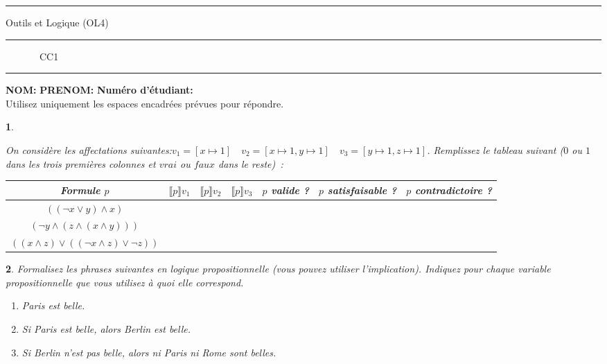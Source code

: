 \documentclass[a4paper,10pt,french]{article}
\newtheorem{exi}{}
\newenvironment{exo}{\begin{exi}\em}{\end{exi}}
\newcommand{\rsem}{\rrbracket}
\newcommand{\inte}[2]{\llbracket #1 \rsem {#2}}
\begin{document}
\vspace*{-1cm}
\hrule
\medbreak
\centerline{\textsf{O{\small utils} et L{\small ogique} (OL4)}}
\medbreak
\hrule
\medbreak
\centerline{\textsf{\phantom{(} ~~~~~~~CC1~~~~~~~\phantom{)}}}
\medbreak
\hrule

\bigskip
\bigskip

{\bf NOM:} \hspace*{4cm} {\bf PRENOM:} \hspace*{3cm} {\bf Numéro
  d'étudiant:}\\

Utilisez uniquement les espaces encadrées prévues pour répondre.

\begin{exo}

  On considère les affectations suivantes:$
v_1 = [ x\mapsto 1] \quad
v_2= [ x\mapsto 1, y\mapsto 1 ]  \quad
v_3= [ y\mapsto 1, z\mapsto 1 ]$.
Remplissez le tableau suivant ($0$ ou $1$ dans les trois premières colonnes et $vrai$ ou $\mathit{faux}$ dans le reste)~:

\begin{tabular}{|c|c|c|c|c|c|c|}
  \hline
    Formule $p$ &$\inte{p}{v_1}$&$\inte{p}{v_2}$&$\inte{p}{v_3}$&$p$ valide ?&$p$ satisfaisable ?&$p$ contradictoire ?\\[0.5ex]
    \hline
    $((\neg x \vee y) \land x)$&&&&&&\\[0.5ex]
    \hline
    $(\neg y \land (z \land (x \land y)))$&&&&&&\\[0.5ex]
    \hline
    $((x \land z) \vee ((\neg x \land z) \vee \neg z))$&&&&&&\\[0.5ex]
    \hline
  \end{tabular}
\end{exo}

\begin{exo}
  Formalisez les phrases suivantes en logique propositionnelle
  (vous pouvez utiliser l'implication).
  Indiquez pour chaque variable propositionnelle que vous utilisez
  à quoi elle correspond.

  \begin{enumerate}
  \item Paris est belle.
  \item Si Paris est belle, alors Berlin est belle.
  \item Si Berlin n'est pas belle, alors ni Paris ni Rome sont belles.
  \end{enumerate}
\end{exo}

 \framebox[\textwidth]{
  \rule[-0.4cm]{0mm}{4cm}
 }
 
\end{document}
